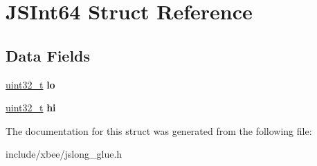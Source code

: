 \hypertarget{struct_j_s_int64}{\section{J\-S\-Int64 Struct Reference}
\label{struct_j_s_int64}
}
\subsection*{Data Fields}
\begin{DoxyCompactItemize}
\item 
\hypertarget{struct_j_s_int64_af696b3c873ee8212d81d86659e59bcc6}{\hyperlink{group__hal__dos_ga09a1e304d66d35dd47daffee9731edaa}{uint32\-\_\-t} {\bfseries lo}}\label{struct_j_s_int64_af696b3c873ee8212d81d86659e59bcc6}

\item 
\hypertarget{struct_j_s_int64_aa824c8f5bb758efbe41747a4005e7456}{\hyperlink{group__hal__dos_ga09a1e304d66d35dd47daffee9731edaa}{uint32\-\_\-t} {\bfseries hi}}\label{struct_j_s_int64_aa824c8f5bb758efbe41747a4005e7456}

\end{DoxyCompactItemize}


The documentation for this struct was generated from the following file\-:\begin{DoxyCompactItemize}
\item 
include/xbee/jslong\-\_\-glue.\-h\end{DoxyCompactItemize}
